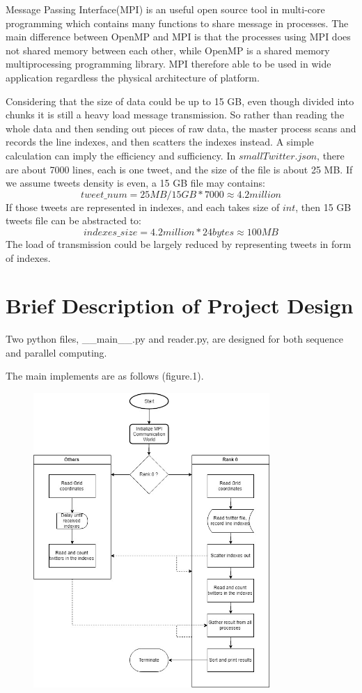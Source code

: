 \documentclass[11pt]{article}
\begin{document}
Message Passing  Interface(MPI) is an useful open source tool in multi-core programming which contains many functions to share message in processes. The main difference between OpenMP and MPI is that the processes using MPI does not shared memory between each other, while OpenMP is a shared memory multiprocessing programming library.  MPI therefore able to be used in wide application regardless the physical architecture of platform.

Considering that the size of data could be up to 15 GB, even though divided into chunks it is still a heavy load message transmission. So rather than reading the whole data and then sending out pieces of raw data, the master process scans and records the line indexes, and then scatters the indexes instead. A simple calculation can imply the efficiency and sufficiency. In $smallTwitter.json$, there are
about 7000 lines, each is one tweet, and the size of the file is about 25 MB. If we assume tweets density is even, a 15 GB file may contains: \[tweet\_num = 25MB / 15GB * 7000 \approx 4.2million\] If those tweets are represented in indexes, and each takes size of $int$, then 15 GB tweets file can be abstracted to: \[indexes\_size = 4.2million * 24bytes \approx 100MB \] The load of transmission could be largely reduced by representing tweets in form of indexes.


\section{Brief Description of Project Design}
Two python files, __main__.py and reader.py, are designed for both sequence and parallel computing.

The main implements are as follows (figure.1).
\begin{figure}[h]
\includegraphics[width=0.8\textwidth]{process}
\end{figure}
\end{document}

